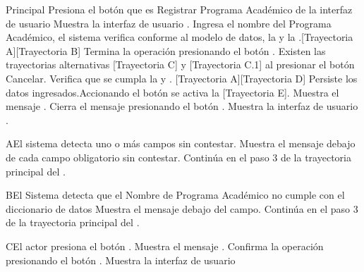\begin{UCtrayectoria}{Principal}
    \UCpaso[\UCactor] Presiona el botón \IUbutton{(+)} que es Registrar Programa Académico de la interfaz de usuario 
    \UCpaso Muestra la interfaz de usuario .
    \UCpaso[\UCactor] Ingresa el nombre del Programa Académico, el sistema verifica conforme al modelo de datos, la  y la .[Trayectoria A][Trayectoria B]
    \UCpaso[\UCactor] Termina la operación presionando el botón . Existen las trayectorias alternativas [Trayectoria C] y [Trayectoria C.1] al presionar el botón Cancelar.
    \UCpaso Verifica que se cumpla la  y . [Trayectoria A][Trayectoria D]
    \UCpaso Persiste los datos ingresados.Accionando el botón  se activa la  [Trayectoria E].
    \UCpaso Muestra el mensaje .
    \UCpaso[\UCactor] Cierra el mensaje presionando el botón .
    \UCpaso Muestra la interfaz de usuario .
\end{UCtrayectoria}


\begin{UCtrayectoriaA}{A}{El sistema detecta uno o más campos sin contestar.}
    \UCpaso Muestra el mensaje  debajo de cada campo obligatorio sin contestar.
    \UCpaso Continúa en el paso 3 de la trayectoria principal del .
\end{UCtrayectoriaA}


\begin{UCtrayectoriaA}{B}{El Sistema detecta que el Nombre de Programa Académico no cumple con el diccionario de datos}
    \UCpaso Muestra el mensaje  debajo del campo.
    \UCpaso Continúa en el paso 3 de la trayectoria principal del .
\end{UCtrayectoriaA}
\begin{UCtrayectoriaA}{C}{El actor presiona el botón .}
    \UCpaso Muestra el mensaje .
    \UCpaso[\UCactor] Confirma la operación presionando el botón .
    \UCpaso Muestra la interfaz de usuario 
\end{UCtrayectoriaA}

